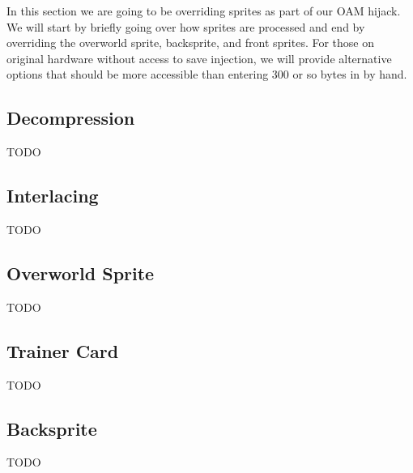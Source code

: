 \documentclass[../main.tex]{subfile}
\begin{document}
    In this section we are going to be overriding sprites as part of our OAM hijack.  We will start by briefly going over how sprites are processed and end by overriding the overworld sprite, backsprite, and front sprites.  For those on original hardware without access to save injection, we will provide alternative options that should be more accessible than entering 300 or so bytes in by hand.

    \subsection{Decompression}
    TODO

    \subsection{Interlacing}
    TODO

    \subsection{Overworld Sprite}
    TODO

    \subsection{Trainer Card}
    TODO

    \subsection{Backsprite}
    TODO
\end{document}
